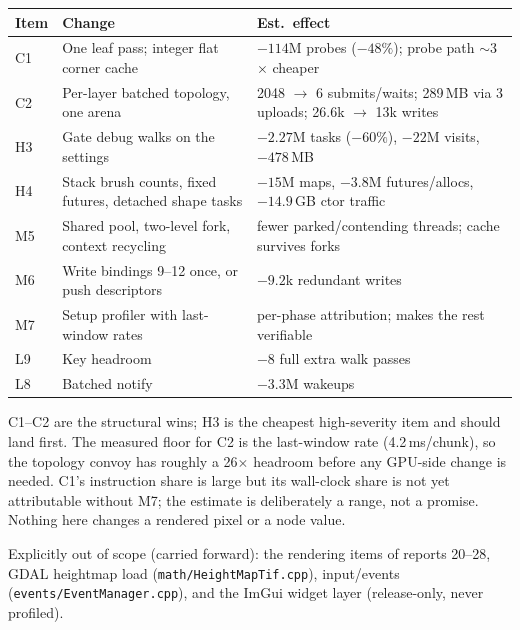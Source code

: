 \documentclass[11pt,a4paper]{article}
\begin{document}
\begin{table}[h]
\centering
\small
\begin{tabular}{@{}lp{5.6cm}p{6.0cm}@{}}
\toprule
\textbf{Item} & \textbf{Change} & \textbf{Est.\ effect} \\
\midrule
C1 & One leaf pass; integer flat corner cache & $-114$M probes ($-48\%$); probe path $\sim$3$\times$ cheaper \\
C2 & Per-layer batched topology, one arena & 2048 $\rightarrow$ 6 submits/waits; 289\,MB via 3 uploads; 26.6k $\rightarrow$ 13k writes \\
H3 & Gate debug walks on the settings & $-2.27$M tasks ($-60\%$), $-22$M visits, $-478$\,MB \\
H4 & Stack brush counts, fixed futures, detached shape tasks & $-15$M maps, $-3.8$M futures/allocs, $-14.9$\,GB ctor traffic \\
M5 & Shared pool, two-level fork, context recycling & fewer parked/contending threads; cache survives forks \\
M6 & Write bindings 9--12 once, or push descriptors & $-9.2$k redundant writes \\
M7 & Setup profiler with last-window rates & per-phase attribution; makes the rest verifiable \\
L9 & Key headroom & $-8$ full extra walk passes \\
L8 & Batched notify & $-3.3$M wakeups \\
\bottomrule
\end{tabular}
\end{table}

C1--C2 are the structural wins; H3 is the cheapest high-severity item and
should land first. The measured floor for C2 is the last-window rate
(4.2\,ms/chunk), so the topology convoy has roughly a 26$\times$ headroom
before any GPU-side change is needed. C1's instruction share is large but its
wall-clock share is not yet attributable without M7; the estimate is
deliberately a range, not a promise. Nothing here changes a rendered pixel or
a node value.

Explicitly out of scope (carried forward): the rendering items of reports
20--28, GDAL heightmap load (\texttt{math/HeightMapTif.cpp}), input/events
(\texttt{events/EventManager.cpp}), and the ImGui widget layer (release-only,
never profiled).

\clearpage
\end{document}
